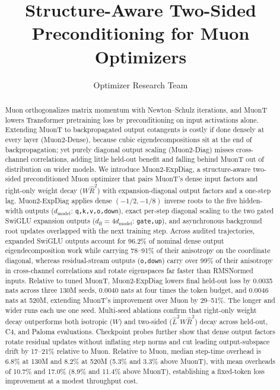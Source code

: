 \documentclass[11pt]{article}
\title{Structure-Aware Two-Sided\\Preconditioning for Muon Optimizers}
\author{Optimizer Research Team}
\newcommand{\dm}{d_{\mathrm{model}}}
\newcommand{\dff}{d_{\mathrm{ff}}}
\newcommand{\mname}[1]{#1}
\begin{document}
\maketitle

\begin{abstract}
\mname{Muon} orthogonalizes matrix momentum with Newton--Schulz iterations, and \mname{MuonT} lowers Transformer pretraining loss by preconditioning on input activations alone. Extending \mname{MuonT} to backpropagated output cotangents is costly if done densely at every layer (\mname{Muon2-Dense}), because cubic eigendecompositions sit at the end of backpropagation; yet purely diagonal output scaling (\mname{Muon2-Diag}) misses cross-channel correlations, adding little held-out benefit and falling behind \mname{MuonT} out of distribution on wider models. We introduce \mname{Muon2-ExpDiag}, a structure-aware two-sided preconditioned Muon optimizer that pairs \mname{MuonT}'s dense input factors and right-only weight decay ($W\hat R^2$) with expansion-diagonal output factors and a one-step lag. \mname{Muon2-ExpDiag} applies dense $(-1/2,-1/8)$ inverse roots to the five hidden-width outputs ($\dm$: \texttt{q,k,v,o,down}), exact per-step diagonal scaling to the two gated SwiGLU expansion outputs ($\dff=4\dm$: \texttt{gate,up}), and asynchronous background root updates overlapped with the next training step. Across audited trajectories, expanded SwiGLU outputs account for 96.2\% of nominal dense output eigendecomposition work while carrying 78--91\% of their anisotropy on the coordinate diagonal, whereas residual-stream outputs (\texttt{o,down}) carry over 99\% of their anisotropy in cross-channel correlations and rotate eigenspaces far faster than RMSNormed inputs. Relative to tuned \mname{MuonT}, \mname{Muon2-ExpDiag} lowers final held-out loss by 0.0035 nats across three 130M seeds, 0.0040 nats at four times the token budget, and 0.0046 nats at 520M, extending \mname{MuonT}'s improvement over \mname{Muon} by 29--51\%. The longer and wider runs each use one seed. Multi-seed ablations confirm that right-only weight decay outperforms both isotropic ($W$) and two-sided ($\hat L^2 W\hat R^2$) decay across held-out, C4, and Paloma evaluations. Checkpoint probes further show that dense output factors rotate residual updates without inflating step norms and cut leading output-subspace drift by 17--21\% relative to \mname{Muon}. Relative to \mname{Muon}, median step-time overhead is 6.8\% at 130M and 8.2\% at 520M (5.3\% and 3.3\% above \mname{MuonT}), with mean overheads of 10.7\% and 17.0\% (8.9\% and 11.4\% above \mname{MuonT}), establishing a fixed-token loss improvement at a modest throughput cost.
\end{abstract}









\FloatBarrier



\clearpage
\appendix
{}

\end{document}
